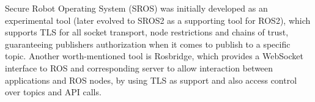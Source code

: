 Secure Robot Operating System (SROS)\cite{white2016sros} was initially developed as an experimental tool (later evolved to SROS2 as a supporting tool for ROS2), which supports TLS for all socket transport, node restrictions and chains of trust, guaranteeing publishers authorization when it comes to publish to a specific topic. Another worth-mentioned tool is Rosbridge\cite{crick2017rosbridge}, which provides a WebSocket interface to ROS and corresponding server to allow interaction between applications and ROS nodes, by using TLS as support and also access control over topics and API calls. 
